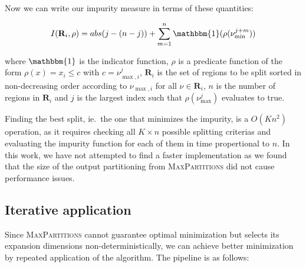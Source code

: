 
Now we can write our impurity measure in terms of these quantities:

\[
    I(\mathbf{R}_{i}, \rho)
    = abs(j - (n - j)) +
    \sum^{n}_{m=1} \mathbbm{1}(\rho(\nu^{j+m}_{\min}))
\]


\noindent
where $\mathbbm{1}$ is the indicator function, $\rho$ is a predicate function
of the form $\rho(x) = x_{i} \leq c$ with $c = \nu^{j}_{\max, i}$,
$\mathbf{R}_{i}$ is the set of regions to be split sorted in non-decreasing
order according to $\nu_{\max,i}$ for all $\nu \in \mathbf{R}_{i}$, $n$ is the
number of regions in $\mathbf{R}_{i}$ and $j$ is the largest index such that
$\rho(\nu^{j}_{\max})$ evaluates to true.

Finding the best split, ie.\ the one that minimizes the impurity, is a $O(Kn^2)$
operation, as it requires checking all $K \times n$ possible splitting criterias
and evaluating the impurity function for each of them in time propertional to
$n$. In this work, we have not attempted to find a faster implementation as we
found that the size of the output partitioning from \textsc{MaxPartitions} did
not cause performance issues.

\subsection{Iterative application}%
\label{sub:iterativeApp}

Since \textsc{MaxPartitions} cannot guarantee optimal minimization but selects
its expansion dimensions non-deterministically, we can achieve better
minimization by repeated application of the algorithm. The pipeline is as
follows:

\begin{center}
\end{center}


